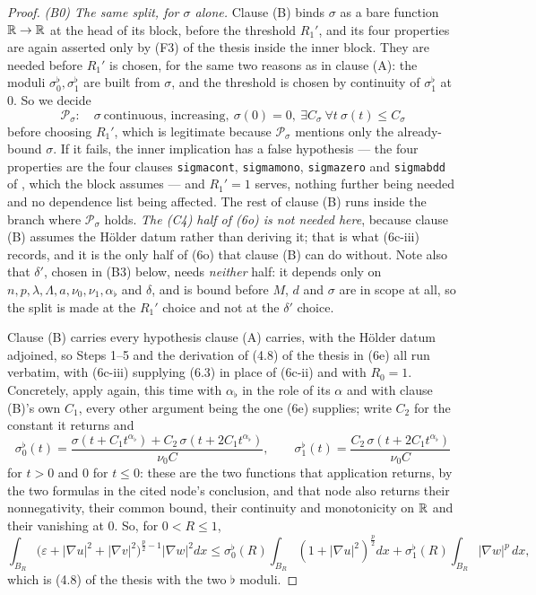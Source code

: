 \begin{proof}
\emph{(B0) The same split, for $\sigma$ alone.}  Clause (B) binds $\sigma$ as a
bare function $\mathbb{R}\to\mathbb{R}$ at the head of its block, before the threshold $R_1'$,
and its four properties are again asserted only by (F3) of the thesis inside the
inner block.  They are needed before $R_1'$ is chosen, for the same two reasons
as in clause (A): the moduli $\sigma_0^{\flat},\sigma_1^{\flat}$ are built from
$\sigma$, and the threshold is chosen by continuity of $\sigma_1^{\flat}$ at
$0$.  So we decide
\[
\mathcal P_\sigma:\quad\sigma\ \text{continuous, increasing},\ \sigma(0)=0,\
\exists C_\sigma\ \forall t\ \sigma(t)\le C_\sigma
\]
before choosing $R_1'$, which is legitimate because $\mathcal P_\sigma$
mentions only the already-bound $\sigma$.  If it fails, the inner implication
has a false hypothesis --- the four properties are the four clauses
\texttt{sigmacont}, \texttt{sigmamono}, \texttt{sigmazero} and
\texttt{sigmabdd} of , which the block
assumes --- and $R_1'=1$ serves, nothing further being needed and no dependence
list being affected.  The rest of clause (B) runs inside the branch where
$\mathcal P_\sigma$ holds.  \emph{The (C4) half of (6o) is not needed here},
because clause (B) assumes the H\"older datum rather than deriving it; that is
what (6c-iii) records, and it is the only half of (6o) that clause (B) can do
without.  Note also that $\delta'$, chosen in (B3) below, needs \emph{neither}
half: it depends only on $n,p,\lambda,\Lambda,a,\nu_0,\nu_1,\alpha_\flat$ and
$\delta$, and is bound before $M$, $d$ and $\sigma$ are in scope at all, so the
split is made at the $R_1'$ choice and not at the $\delta'$ choice.

Clause (B) carries every hypothesis clause (A) carries, with the H\"older datum
adjoined, so Steps 1--5 and the derivation of
(4.8) of the thesis in (6e) all run verbatim, with (6c-iii) supplying (6.3) in place
of (6c-ii) and with $R_0=1$.  Concretely, apply
 again, this time with $\alpha_\flat$ in the
role of its $\alpha$ and with clause (B)'s own $C_1$, every other argument
being the one (6e) supplies; write $C_2$ for the constant it returns and
\[
\sigma_0^{\flat}(t)
=\frac{\sigma(t+C_1t^{\alpha_\flat})+C_2\,\sigma(t+2C_1t^{\alpha_\flat})}{\nu_0C},
\qquad
\sigma_1^{\flat}(t)=\frac{C_2\,\sigma(t+2C_1t^{\alpha_\flat})}{\nu_0C}
\]
for $t>0$ and $0$ for $t\le0$: these are the two functions that application
returns, by the two formulas in the cited node's conclusion, and that node also
returns their nonnegativity, their common bound, their continuity and
monotonicity on $\mathbb{R}$ and their vanishing at $0$.  So, for $0<R\le1$,
\[
\int_{B_R}\bigl(\varepsilon+|\nabla u|^2+|\nabla v|^2\bigr)^{\frac p2-1}
|\nabla w|^2dx
\le\sigma_0^{\flat}(R)\int_{B_R}(1+|\nabla u|^2)^{\frac p2}dx
+\sigma_1^{\flat}(R)\int_{B_R}|\nabla w|^p\,dx ,
\tag{4.8B}
\]
which is (4.8) of the thesis with the two $\flat$ moduli.


\end{proof}
